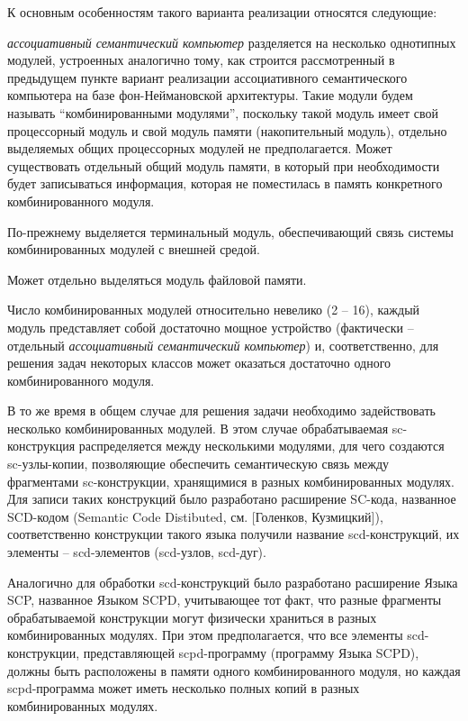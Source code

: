 К основным особенностям такого варианта реализации относятся следующие:
\begin{textitemize}
	\item \textit{ассоциативный семантический компьютер} разделяется на несколько однотипных модулей, устроенных аналогично тому, как строится рассмотренный в предыдущем пункте вариант реализации ассоциативного семантического компьютера на базе фон-Неймановской архитектуры. Такие модули будем называть ``комбинированными модулями'', поскольку такой модуль имеет свой процессорный модуль и свой модуль памяти (накопительный модуль), отдельно выделяемых общих процессорных модулей не предполагается. Может существовать отдельный общий модуль памяти, в который при необходимости будет записываться информация, которая не поместилась в память конкретного комбинированного модуля.
	\item По-прежнему выделяется терминальный модуль, обеспечивающий связь системы комбинированных модулей с внешней средой.
	\item Может отдельно выделяться модуль файловой памяти.
	\item Число комбинированных модулей относительно невелико (2 -- 16), каждый модуль представляет собой достаточно мощное устройство (фактически -- отдельный \textit{ассоциативный семантический компьютер}) и, соответственно, для решения задач некоторых классов может оказаться достаточно одного комбинированного модуля.
	\item В то же время в общем случае для решения задачи необходимо задействовать несколько комбинированных модулей. В этом случае обрабатываемая sc-конструкция распределяется между несколькими модулями, для чего создаются sc-узлы-копии, позволяющие обеспечить семантическую связь между фрагментами sc-конструкции, хранящимися в разных комбинированных модулях. Для записи таких конструкций было разработано расширение SC-кода, названное SCD-кодом (Semantic Code Distibuted, см. [Голенков, Кузмицкий]), соответственно конструкции такого языка получили название scd-конструкций, их элементы -- scd-элементов (scd-узлов, scd-дуг).
	\item Аналогично для обработки scd-конструкций было разработано расширение Языка SCP, названное Языком SCPD, учитывающее тот факт, что разные фрагменты обрабатываемой конструкции могут физически храниться в разных комбинированных модулях. При этом предполагается, что все элементы scd-конструкции, представляющей scpd-программу (программу Языка SCPD), должны быть расположены в памяти одного комбинированного модуля, но каждая scpd-программа может иметь несколько полных копий в разных комбинированных модулях.

\end{textitemize}
